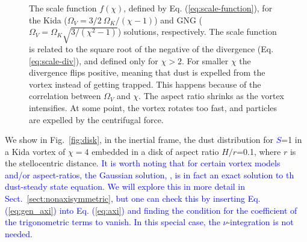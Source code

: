 \documentclass[apj]{emulateapj}
\def\blue#1{\textcolor{blue}{#1}}
\newcommand{\Eq}[1]{Eq. (\ref{#1})}
\newcommand{\eq}[1]{\Eq{#1}}
\newcommand{\eqp}[1]{(Eq. \ref{#1})}
\newcommand{\Fig}[1]{Fig.~\ref{#1}}
\newcommand{\fig}[1]{\Fig{#1}}
\newcommand{\sect}[1]{Sect.~\ref{#1}}
\begin{document}
\begin{figure}
  \begin{center}
  \end{center}
\caption[]{The scale function $f(\chi)$, defined by
  \eq{eq:scale-function}, for the Kida ($\varOmega_V=3/2
  \ \varOmega_K/(\chi-1)$) and GNG ($\varOmega_V=\varOmega_K
  \sqrt{3/(\chi^2-1)}$) solutions, respectively. The scale function is
  related to the square root of the negative of the divergence
  \eqp{eq:scale-div}, and defined only for $\chi>2$. For smaller $\chi$ the
  divergence flips positive, meaning that dust is expelled from the
  vortex instead of getting trapped. This happens because of the
  correlation between $\varOmega_V$ and $\chi$. The aspect ratio shrinks
  as the vortex intensifies. At some point, the vortex rotates too
  fast, and particles are expelled by the centrifugal force.}
 \label{fig:scale-function}
\end{figure}

We show in \fig{fig:disk}, in the inertial frame, 
the dust distribution for \blue{$S$}=1 in a Kida vortex of $\chi=4$ embedded in a 
disk of aspect ratio $H/r$=0.1, where $r$ is the stellocentric
distance. \blue{It is worth noting that for certain vortex models and/or
aspect-ratios, the Gaussian solution, \label{eq:dust-trapping-uvzero}, is in fact an 
exact solution to th dust-steady state equation.  We will explore this
in more detail  in 
\sect{sect:nonaxisymmetric}, but one can check this by inserting
\eq{eq:gen_axi} into 
\eq{eq:axi} and finding the condition for the coefficient of the trigonometric terms to vanish. In this special case, the $\nu$-integration is not needed.} 
\end{document}
